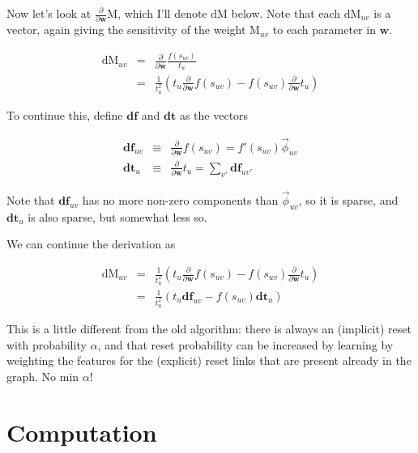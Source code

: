 \documentclass[12pt]{article}
\newcommand{\vek}[1]{\textbf{#1}}
\newcommand{\ddw}{\frac{\partial}{\partial\vek{w}}}
\newcommand{\M}{\textrm{M}}
\newcommand{\dM}{\textrm{dM}}
\newcommand{\df}{\textbf{df}}
\newcommand{\dt}{\textbf{dt}}
\newcommand{\vphi}{\vec{\phi}}
\begin{document}
Now let's look at $\ddw\M$, which I'll denote $\dM$ below.  Note that
each $\dM_{uv}$ is a vector, again giving the sensitivity of the
weight $\M_{uv}$ to each parameter in $\vek{w}$.

\begin{eqnarray}
\dM_{uv}   & = & \ddw \frac{ f(s_{uv}) }{ t_u } \\
           & = & \frac{1}{t_u ^2} \left( t_u \ddw f(s_{uv}) - f(s_{uv}) \ddw t_u \right)
\end{eqnarray}

To continue this, define $\df$ and $\dt$ as the vectors

\begin{eqnarray}
 \df_{uv} & \equiv & \ddw f(s_{uv}) = f'(s_{uv}) \vphi_{uv} \label{eqn:fprime} \\
 \dt_{u}  & \equiv & \ddw t_u = \sum_{v'} \df_{uv'}
\end{eqnarray}

Note that $\df_{uv}$ has no more non-zero components than
$\vphi_{uv}$, so it is sparse, and $\dt_{u}$ is also sparse, but
somewhat less so.

We can continue the derivation as

\begin{eqnarray}
\dM_{uv}   & = & \frac{1}{t_u ^2} \left( t_u \ddw f(s_{uv}) - f(s_{uv}) \ddw t_u \right) \\
           & = & \frac{1}{t_u ^2} \left( t_u \df_{uv} - f(s_{uv}) \dt_u \right)
\end{eqnarray}

This is a little different from the old algorithm: there is always an
(implicit) reset with probability $\alpha$, and that reset probability
can be increased by learning by weighting the features for the
(explicit) reset links that are present already in the graph.  No min
$\alpha$!

\section{Computation}
\end{document}
